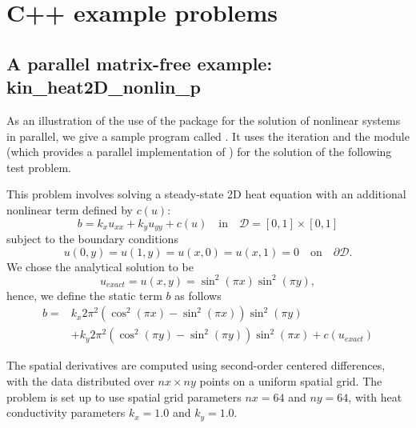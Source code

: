 \section{C++ example problems}\label{s:ex_cpp}

\subsection{A parallel matrix-free example: kin\_heat2D\_nonlin\_p}\label{ss:kin_heat2D_nonlin_p}

As an illustration of the use of the {\kinsol} package for the
solution of nonlinear systems in parallel, 
we give a sample program called .
It uses the {\kinsol}  iteration 
and the {\nvecp} module (which provides a parallel implementation of {\nvector})
for the solution of the following test problem.

This problem involves solving a steady-state 2D heat equation with an additional
nonlinear term defined by $c(u)$:
\begin{equation}
    b = k_x u_{xx} + k_y u_{yy} + c(u) \quad \text{in} \quad \mathcal{D}
        = [0,1] \times [0,1]
\end{equation}
subject to the boundary conditions
\begin{equation}
    u(0,y) = u(1,y) = u(x,0) = u(x,1) = 0 \quad \text{on} \quad \partial \mathcal{D}.
\end{equation}
We chose the analytical solution to be
\begin{equation}
    u_{exact} = u(x,y) = \sin^2(\pi x) \sin^2(\pi y),
\end{equation}
hence, we define the static term $b$ as follows
\begin{equation}
\begin{aligned}
    b = &k_x 2 \pi^2 (\cos^2(\pi x) - \sin^2(\pi x)) \sin^2(\pi y) \\
        &+ k_y 2 \pi^2 (\cos^2(\pi y) - \sin^2(\pi y)) \sin^2(\pi x) + c(u_{exact})
\end{aligned}
\end{equation}

The spatial derivatives are computed using second-order centered
differences, with the data distributed over $nx\times ny$ points
on a uniform spatial grid.  
The problem is set up to use spatial grid parameters $nx=64$ and
$ny=64$, with heat conductivity parameters $k_x=1.0$ and
$k_y=1.0$.  

